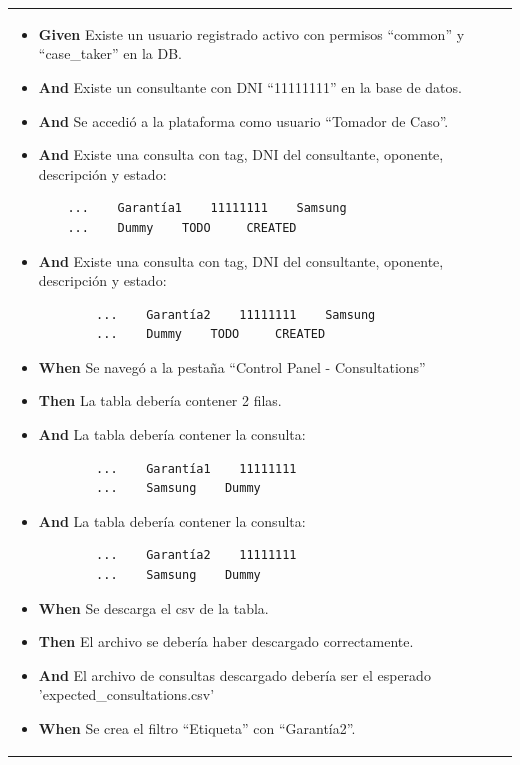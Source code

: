 \begin{longtable}{|p{1cm}|p{2.5cm}|p{12cm}|}
    \begin{itemize}
        \item \textbf{Given} Existe un usuario registrado activo con permisos ``common'' y ``case\_taker'' en la DB.
        \item \textbf{And} Existe un consultante con DNI ``11111111'' en la base de datos.
        \item \textbf{And} Se accedió a la plataforma como usuario ``Tomador de Caso''.
        \item \textbf{And} Existe una consulta con tag, DNI del consultante, oponente, descripción y estado:
        \begin{verbatim}
    ...    Garantía1    11111111    Samsung
    ...    Dummy    TODO     CREATED
        \end{verbatim}
        \item \textbf{And} Existe una consulta con tag, DNI del consultante, oponente, descripción y estado:
        \begin{verbatim}
        ...    Garantía2    11111111    Samsung
        ...    Dummy    TODO     CREATED
        \end{verbatim}
        \item \textbf{When} Se navegó a la pestaña ``Control Panel - Consultations''
    
        \item \textbf{Then} La tabla debería contener 2 filas.
        \item \textbf{And} La tabla debería contener la consulta:
        \begin{verbatim}
        ...    Garantía1    11111111
        ...    Samsung    Dummy
        \end{verbatim}
        \item \textbf{And} La tabla debería contener la consulta:
        \begin{verbatim}
        ...    Garantía2    11111111
        ...    Samsung    Dummy
        \end{verbatim}

        \item \textbf{When} Se descarga el csv de la tabla.

        \item \textbf{Then} El archivo se debería haber descargado correctamente.
        \item \textbf{And} El archivo de consultas descargado debería ser el esperado 'expected\_consultations.csv'
    
        \item \textbf{When} Se crea el filtro ``Etiqueta'' con ``Garantía2''.
    

\end{itemize}
\end{longtable}
